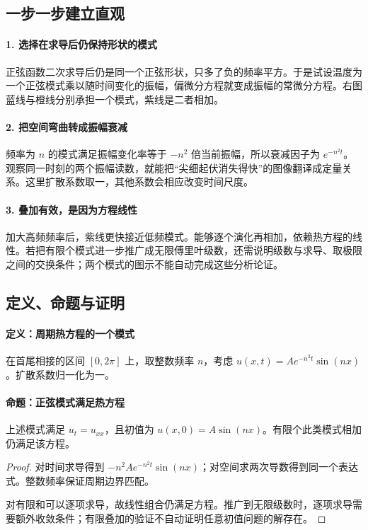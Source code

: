 \subsection*{一步一步建立直观}

\paragraph{1. 选择在求导后仍保持形状的模式}

正弦函数二次求导后仍是同一个正弦形状，只多了负的频率平方。于是试设温度为一个正弦模式乘以随时间变化的振幅，偏微分方程就变成振幅的常微分方程。右图蓝线与橙线分别承担一个模式，紫线是二者相加。



\paragraph{2. 把空间弯曲转成振幅衰减}

频率为 $n$ 的模式满足振幅变化率等于 $-n^2$ 倍当前振幅，所以衰减因子为 $e^{-n^2t}$。观察同一时刻的两个振幅读数，就能把“尖细起伏消失得快”的图像翻译成定量关系。这里扩散系数取一，其他系数会相应改变时间尺度。



\paragraph{3. 叠加有效，是因为方程线性}

加大高频频率后，紫线更快接近低频模式。能够逐个演化再相加，依赖热方程的线性。若把有限个模式进一步推广成无限傅里叶级数，还需说明级数与求导、取极限之间的交换条件；两个模式的图示不能自动完成这些分析论证。



\subsection*{定义、命题与证明}

\paragraph{定义：周期热方程的一个模式}

在首尾相接的区间 $[0,2\pi]$ 上，取整数频率 $n$，考虑 $u(x,t)=A e^{-n^2t}\sin(nx)$。扩散系数归一化为一。

\paragraph{命题：正弦模式满足热方程}

上述模式满足 $u_t=u_{xx}$，且初值为 $u(x,0)=A\sin(nx)$。有限个此类模式相加仍满足该方程。

\begin{proof}

对时间求导得到 $-n^2A e^{-n^2t}\sin(nx)$；对空间求两次导数得到同一个表达式。整数频率保证周期边界匹配。

对有限和可以逐项求导，故线性组合仍满足方程。推广到无限级数时，逐项求导需要额外收敛条件；有限叠加的验证不自动证明任意初值问题的解存在。

\end{proof}
